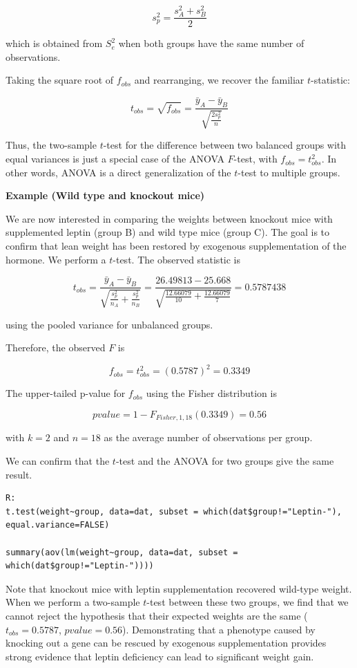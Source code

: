 \documentclass[
]{book}
\begin{document}
\[
s_p^2 = \frac{s_A^2 + s_B^2}{2}
\]

which is obtained from \(S_e^2\) when both groups have the same number of observations.

Taking the square root of \(f_{obs}\) and rearranging, we recover the familiar \(t\)-statistic:

\[
t_{obs} = \sqrt{f_{obs}} = \frac{\bar{y}_{A} - \bar{y}_{B}}{\sqrt{\tfrac{2s_p^2}{n}}}
\]

Thus, the two-sample \(t\)-test for the difference between two balanced groups with equal variances is just a special case of the ANOVA \(F\)-test, with \(f_{obs}=t_{obs}^2\). In other words, ANOVA is a direct generalization of the \(t\)-test to multiple groups.

\textbf{Example (Wild type and knockout mice)}

We are now interested in comparing the weights between knockout mice with supplemented leptin (group B) and wild type mice (group C). The goal is to confirm that lean weight has been restored by exogenous supplementation of the hormone. We perform a \(t\)-test. The observed statistic is

\[t_{obs}=\frac{\bar{y}_A-\bar{y}_B }{\sqrt{\frac{s^2_p}{n_A}+\frac{s^2_p}{n_B}}}=\frac{26.49813-25.668}{\sqrt{\frac{12.66079}{10}+\frac{12.66079}{7}}}=0.5787438\]

using the pooled variance for unbalanced groups.

Therefore, the observed \(F\) is

\[f_{obs}=t_{obs}^2=(0.5787)^2=0.3349\]

The upper-tailed p-value for \(f_{obs}\) using the Fisher distribution is

\[pvalue=1-F_{Fisher,1,18}(0.3349)= 0.56\]

with \(k=2\) and \(n=18\) as the average number of observations per group.

We can confirm that the \(t\)-test and the ANOVA for two groups give the same result.

\begin{verbatim}
R:
t.test(weight~group, data=dat, subset = which(dat$group!="Leptin-"), 
equal.variance=FALSE)

summary(aov(lm(weight~group, data=dat, subset = which(dat$group!="Leptin-"))))
\end{verbatim}

Note that knockout mice with leptin supplementation recovered wild-type weight. When we perform a two-sample \(t\)-test between these two groups, we find that we cannot reject the hypothesis that their expected weights are the same (\(t_{obs}=0.5787\), \(pvalue=0.56\)). Demonstrating that a phenotype caused by knocking out a gene can be rescued by exogenous supplementation provides strong evidence that leptin deficiency can lead to significant weight gain.
\end{document}
